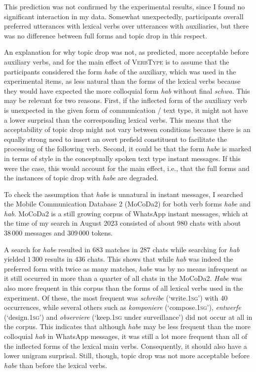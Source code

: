 This prediction was not confirmed by the experimental results, since I found no significant interaction in my data.
Somewhat unexpectedly, participants overall preferred utterances with lexical verbs over utterances with auxiliaries, but there was no difference between full forms and topic drop in this respect.

An explanation for why topic drop was not, as predicted, more acceptable before auxiliary verbs, and for the main effect of \textsc{VerbType} is to assume that the participants considered the form \textit{habe} of the auxiliary, which was used in the experimental items, as less natural than the forms of the lexical verbs because they would have expected the more colloquial form \textit{hab} without final \textit{schwa}.
This may be relevant for two reasons.
First, if the inflected form of the auxiliary verb is unexpected in the given form of communication / text type,  it might not have a lower surprisal than the corresponding lexical verbs.
This means that the acceptability of topic drop might not vary between conditions because there is an equally strong need to insert an overt prefield constituent to facilitate the processing of the following verb. 
Second, it could be that the form \textit{habe} is marked in terms of style in the conceptually spoken text type instant messages.
If this were the case, this would account for the main effect, i.e., that the full forms and the instances of topic drop with \textit{habe} are degraded.

To check the assumption that \textit{habe} is unnatural in instant messages, I searched the Mobile Communication Database 2 (MoCoDa2) \citep{beisswenger.etal2020} for both verb forms \textit{habe} and \textit{hab}.
MoCoDa2 is a still growing corpus  of WhatsApp instant messages, which at the time of my search in August 2023 consisted of about $980$ chats with about $38\,000$ messages and $309\,000$ tokens.

A search for \textit{habe} resulted in $683$ matches in $287$ chats while searching for \textit{hab} yielded $1\,300$ results in $436$ chats.
This shows that while \textit{hab} was indeed the preferred form with twice as many matches, \textit{habe} was by no means infrequent as it still occurred in more than a quarter of all chats in the MoCoDa2.
\textit{Habe} was also more frequent in this corpus than the forms of all lexical verbs used in the experiment.
Of these, the most frequent was \textit{schreibe} (`write.\textsc{1sg}') with 40 occurrences, while several others such as \textit{komponiere} (`compose.\textsc{1sg}'), \textit{entwerfe} (`design.\textsc{1sg}') and \textit{observiere} (`keep.\textsc{1sg} under surveillance') did not occur at all in the corpus.
This indicates that although \textit{habe} may be less frequent than the more colloquial \textit{hab} in WhatsApp messages, it was still a lot more frequent than all of the inflected forms of the lexical main verbs.
Consequently, it should also have a lower unigram surprisal.
Still, though, topic drop was not more acceptable before \textit{habe} than before the lexical verbs.

